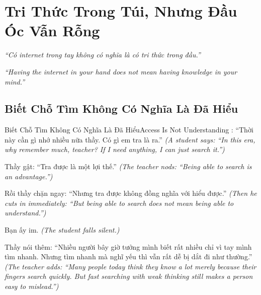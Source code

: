 \chapter{Tri Thức Trong Túi, Nhưng Đầu Óc Vẫn Rỗng}

\begin{center}
	\textit{\color{bookprimary}``Có internet trong tay không có nghĩa là có tri thức trong đầu.''}

	\textit{\color{bookprimary}``Having the internet in your hand does not mean having knowledge in your mind.''}
\end{center}

\ngancach

\section{Biết Chỗ Tìm Không Có Nghĩa Là Đã Hiểu}
\begin{truyen}{Biết Chỗ Tìm Không Có Nghĩa Là Đã Hiểu}{Access Is Not Understanding}
: ``Thời này cần gì nhớ nhiều nữa thầy. Có gì em tra là ra.''
\textit{(A student says: ``In this era, why remember much, teacher? If I need anything, I can just search it.'')}

Thầy gật: ``Tra được là một lợi thế.''
\textit{(The teacher nods: ``Being able to search is an advantage.'')}

Rồi thầy chặn ngay: ``Nhưng tra được không đồng nghĩa với hiểu được.''
\textit{(Then he cuts in immediately: ``But being able to search does not mean being able to understand.'')}


Bạn ấy im.
\textit{(The student falls silent.)}

Thầy nói thêm: ``Nhiều người bây giờ tưởng mình biết rất nhiều chỉ vì tay mình tìm nhanh. Nhưng tìm nhanh mà nghĩ yếu thì vẫn rất dễ bị dắt đi như thường.''
\textit{(The teacher adds: ``Many people today think they know a lot merely because their fingers search quickly. But fast searching with weak thinking still makes a person easy to mislead.'')}
\end{truyen}

